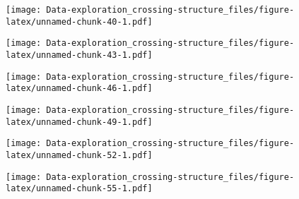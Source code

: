 \documentclass[]{article}
\begin{document}
\texttt{[image: Data-exploration\_crossing-structure\_files/figure-latex/unnamed-chunk-40-1.pdf]}

\texttt{[image: Data-exploration\_crossing-structure\_files/figure-latex/unnamed-chunk-43-1.pdf]}

\texttt{[image: Data-exploration\_crossing-structure\_files/figure-latex/unnamed-chunk-46-1.pdf]}

\texttt{[image: Data-exploration\_crossing-structure\_files/figure-latex/unnamed-chunk-49-1.pdf]}

\texttt{[image: Data-exploration\_crossing-structure\_files/figure-latex/unnamed-chunk-52-1.pdf]}

\texttt{[image: Data-exploration\_crossing-structure\_files/figure-latex/unnamed-chunk-55-1.pdf]}
\end{document}
